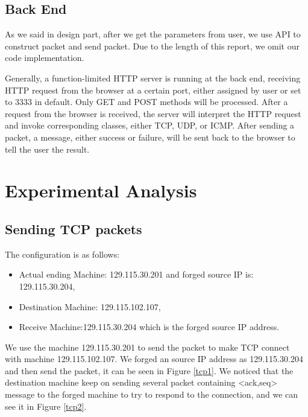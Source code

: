 \documentclass[12pt,letterpaper]{report}
\begin{document}
\section*{Back End}
As we said in design part, after we get the parameters 
from user, we use API to construct packet and send packet. 
Due to the length of this report, we omit our code 
implementation.

Generally, a function-limited HTTP server is running 
at the back end, receiving HTTP request from the 
browser at a certain port, either assigned by user or 
set to 3333 in default. Only GET and POST methods
will be processed. After a request from the browser
is received, the server will interpret the HTTP request
and invoke corresponding classes, either TCP, UDP, or
ICMP. After sending a packet, a message, either 
success or failure, will be sent back to the browser
to tell the user the result. 

\chapter*{Experimental Analysis}
\section*{Sending TCP packets}
The configuration is as follows:
\begin{itemize}
 \item Actual ending Machine: 129.115.30.201 and forged 
 source IP is: 129.115.30.204,
 \item Destination Machine: 129.115.102.107,
 \item Receive Machine:129.115.30.204 which is the forged 
 source IP address.
\end{itemize}

We use the machine 129.115.30.201 to send the packet 
to make TCP connect with machine 129.115.102.107. We 
forged an source IP address as 129.115.30.204 and then 
send the packet, it can be seen in Figure \ref{tcp1}. We noticed that 
the destination machine keep on sending several packet 
containing <ack,seq> message to the forged machine to 
try to respond to the connection, and we can see it in 
Figure \ref{tcp2}.
\end{document}
